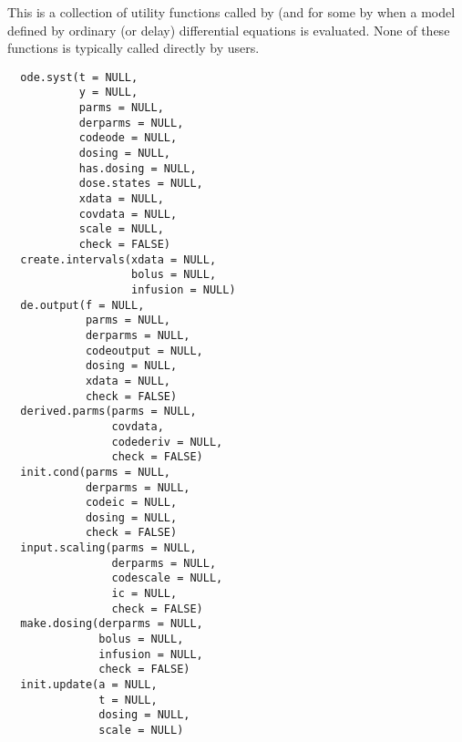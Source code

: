 %
\begin{Description}\relax
This is a collection of utility functions called by  (and for 
some by  when a model defined by ordinary (or delay)
differential equations is evaluated. None of these functions is typically 
called directly by users.
\end{Description}
%
\begin{Usage}
\begin{verbatim}
  ode.syst(t = NULL,
           y = NULL,
           parms = NULL,
           derparms = NULL,
           codeode = NULL,
           dosing = NULL,
           has.dosing = NULL,
           dose.states = NULL,
           xdata = NULL,
           covdata = NULL,
           scale = NULL,
           check = FALSE)
  create.intervals(xdata = NULL,
                   bolus = NULL,
                   infusion = NULL)
  de.output(f = NULL,
            parms = NULL,
            derparms = NULL,
            codeoutput = NULL,
            dosing = NULL,
            xdata = NULL,
            check = FALSE)
  derived.parms(parms = NULL,
                covdata,
                codederiv = NULL,
                check = FALSE)
  init.cond(parms = NULL,
            derparms = NULL,
            codeic = NULL,
            dosing = NULL,
            check = FALSE)
  input.scaling(parms = NULL,
                derparms = NULL,
                codescale = NULL,
                ic = NULL,
                check = FALSE)
  make.dosing(derparms = NULL,
              bolus = NULL,
              infusion = NULL,
              check = FALSE)
  init.update(a = NULL,
              t = NULL,
              dosing = NULL,
              scale = NULL)
\end{verbatim}
\end{Usage}
%

